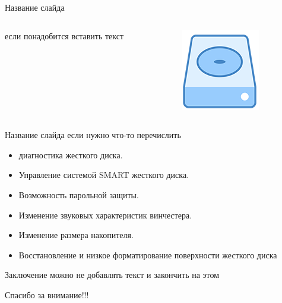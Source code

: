 \documentclass{beamer}
\begin{document}
\begin{frame}{Название слайда}
    \begin{columns}
        \begin{column}{0.6\textwidth}
            если понадобится вставить текст
        \end{column}
        \begin{column}{0.4\textwidth}
            \includegraphics[width=\textwidth]{images/mhdd.png}
        \end{column}
    \end{columns}
\end{frame}
\begin{frame}{Название слайда}
если нужно что-то перечислить
    \begin{itemize}
        \item диагностика жесткого диска.
        \item Управление системой SMART жесткого диска.
        \item Возможность парольной защиты.
        \item Изменение звуковых характеристик винчестера.
        \item Изменение размера накопителя.
        \item Восстановление и низкое форматирование поверхности жесткого диска
    \end{itemize}
\end{frame}
\begin{frame}{Заключение}
можно не добавлять текст и закончить на этом
    \begin{center}
        \Huge{Спасибо за внимание!!!}
    \end{center}
\end{frame}
\end{document}
